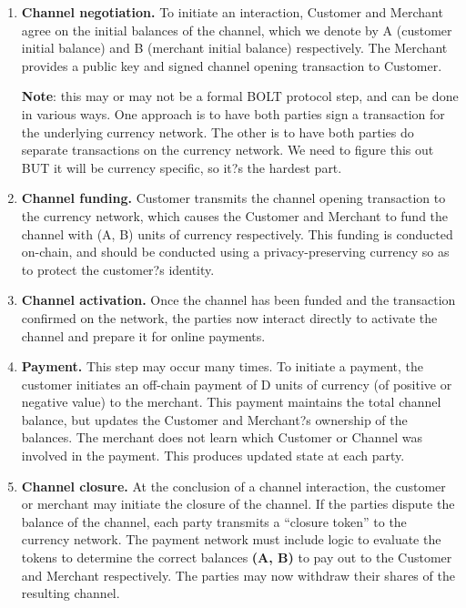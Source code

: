 \documentclass[10pt]{report}
\begin{document}
\begin{enumerate}
\item {\bf Channel negotiation.} To initiate an interaction, Customer and Merchant agree on the initial balances of the channel, which we denote by A (customer initial balance) and B (merchant initial balance) respectively. The Merchant provides a public key and signed channel opening transaction to Customer. 

{\bf Note}: this may or may not be a formal BOLT protocol step, and can be done in various ways. One approach is to have both parties sign a transaction for the underlying currency network. The other is to have both parties do separate transactions on the currency network. We need to figure this out BUT it will be currency specific, so it?s the hardest part.

\item {\bf Channel funding.} Customer transmits the channel opening transaction to the currency network, which causes the Customer and Merchant to fund the channel with (A, B) units of currency respectively. This funding is conducted on-chain, and should be conducted using a privacy-preserving currency so as to protect the customer?s identity.

\item {\bf Channel activation.} Once the channel has been funded and the transaction confirmed on the network, the parties now interact directly to activate the channel and prepare it for online payments. 

\item {\bf Payment.} This step may occur many times. To initiate a payment, the customer initiates an off-chain payment of D units of currency (of positive or negative value) to the merchant. This payment maintains the total channel balance, but updates the Customer and Merchant?s ownership of the balances. The merchant does not learn which Customer or Channel was involved in the payment. This produces updated state at each party.

\item {\bf Channel closure.} At the conclusion of a channel interaction, the customer or merchant may initiate the closure of the channel. If the parties dispute the balance of the channel, each party transmits a ``closure token'' to the currency network. The payment network must include logic to evaluate the tokens to determine the correct balances {\bf (A,  B)} to pay out to the Customer and Merchant respectively. The parties may now withdraw their shares of the resulting channel.

\end{enumerate}
\end{document}
